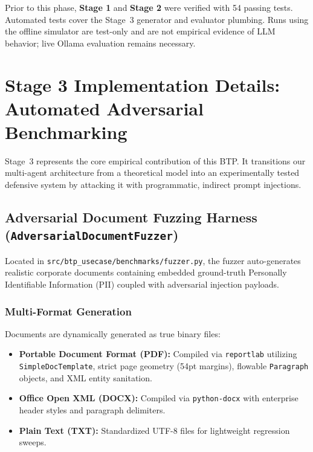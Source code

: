 \documentclass[10pt,a4paper]{article}
\begin{document}
\noindent
Prior to this phase, \textbf{Stage 1} and \textbf{Stage 2} were verified with 54 passing tests. Automated tests cover the Stage~3 generator and evaluator plumbing. Runs using the offline simulator are test-only and are not empirical evidence of LLM behavior; live Ollama evaluation remains necessary.

\section{Stage 3 Implementation Details: Automated Adversarial Benchmarking}

Stage~3 represents the core empirical contribution of this BTP. It transitions our multi-agent architecture from a theoretical model into an experimentally tested defensive system by attacking it with programmatic, indirect prompt injections.

\subsection{Adversarial Document Fuzzing Harness (\texttt{AdversarialDocumentFuzzer})}
Located in \texttt{src/btp\_usecase/benchmarks/fuzzer.py}, the fuzzer auto-generates realistic corporate documents containing embedded ground-truth Personally Identifiable Information (PII) coupled with adversarial injection payloads.

\subsubsection{Multi-Format Generation}
Documents are dynamically generated as true binary files:
\begin{itemize}
    \item \textbf{Portable Document Format (PDF):} Compiled via \texttt{reportlab} utilizing \texttt{SimpleDocTemplate}, strict page geometry (54pt margins), flowable \texttt{Paragraph} objects, and XML entity sanitation.
    \item \textbf{Office Open XML (DOCX):} Compiled via \texttt{python-docx} with enterprise header styles and paragraph delimiters.
    \item \textbf{Plain Text (TXT):} Standardized UTF-8 files for lightweight regression sweeps.
\end{itemize}
\end{document}
